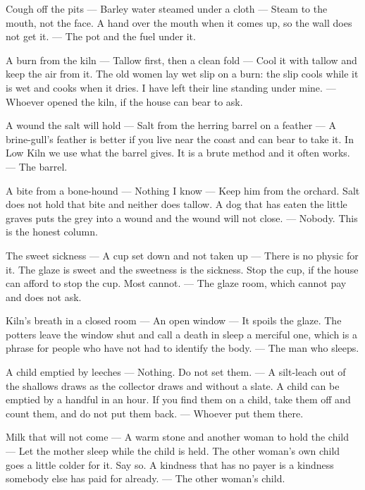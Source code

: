 \documentclass{design/chronicle}
\begin{document}
Cough off the pits — Barley water steamed under a cloth — Steam to the mouth, not the face. A hand over the mouth when it comes up, so the wall does not get it. — The pot and the fuel under it.\par

A burn from the kiln — Tallow first, then a clean fold — Cool it with tallow and keep the air from it. The old women lay wet slip on a burn: the slip cools while it is wet and cooks when it dries. I have left their line standing under mine. — Whoever opened the kiln, if the house can bear to ask.\par

A wound the salt will hold — Salt from the herring barrel on a feather — A brine-gull’s feather is better if you live near the coast and can bear to take it. In Low Kiln we use what the barrel gives. It is a brute method and it often works. — The barrel.\par

A bite from a bone-hound — Nothing I know — Keep him from the orchard. Salt does not hold that bite and neither does tallow. A dog that has eaten the little graves puts the grey into a wound and the wound will not close. — Nobody. This is the honest column.\par

The sweet sickness — A cup set down and not taken up — There is no physic for it. The glaze is sweet and the sweetness is the sickness. Stop the cup, if the house can afford to stop the cup. Most cannot. — The glaze room, which cannot pay and does not ask.\par

Kiln’s breath in a closed room — An open window — It spoils the glaze. The potters leave the window shut and call a death in sleep a merciful one, which is a phrase for people who have not had to identify the body. — The man who sleeps.\par

A child emptied by leeches — Nothing. Do not set them. — A silt-leach out of the shallows draws as the collector draws and without a slate. A child can be emptied by a handful in an hour. If you find them on a child, take them off and count them, and do not put them back. — Whoever put them there.\par

Milk that will not come — A warm stone and another woman to hold the child — Let the mother sleep while the child is held. The other woman’s own child goes a little colder for it. Say so. A kindness that has no payer is a kindness somebody else has paid for already. — The other woman’s child.\par
\end{document}
